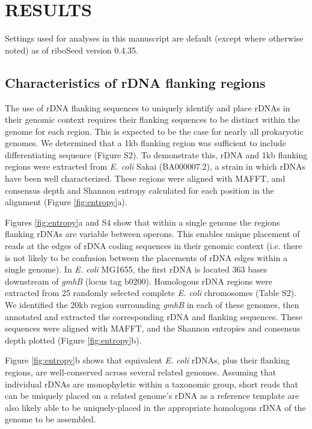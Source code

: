 \documentclass[a4,center,fleqn]{NAR}
\begin{document}
\section{RESULTS}

Settings used for analyses in this manuscript are default (except where otherwise noted) as of riboSeed version 0.4.35\cite{nicholas_r_waters_2017_1037965}.

\subsection*{Characteristics of rDNA flanking regions}
The use of rDNA flanking sequences to uniquely identify and place rDNAs in their genomic context requires their flanking sequences to be distinct within the genome for each region. This is expected to be the case for nearly all prokaryotic genomes. We determined that a 1kb flanking region was sufficient to include differentiating sequence (Figure S2). To demonstrate this, rDNA and 1kb flanking regions were extracted from \textit{E. coli} Sakai \cite{Hayashi2001} (BA000007.2), a strain in which  rDNAs have been well characterized\cite{Ohnishi2000}. These regions were aligned with MAFFT\cite{Katoh2002}, and consensus depth and Shannon entropy calculated for each position in the alignment (Figure \ref{fig:entropy}a).

Figures \ref{fig:entropy}a and S4 show that within a single genome the regions flanking rDNAs are variable between operons. This enables unique placement of reads at the edges of rDNA coding sequences in their genomic context (i.e. there is not likely to be confusion between the placements of rDNA edges within a single genome).
In \textit{E. coli} MG1655, the first rDNA is located 363 bases downstream of \textit{gmhB} (locus tag b0200). Homologous rDNA regions were extracted from 25 randomly selected complete \textit{E. coli} chromosomes (Table S2).  We identified the 20kb region surrounding \textit{gmhB} in each of these genomes, then annotated and extracted the corresponding rDNA and flanking sequences. These sequences were aligned with MAFFT, and the Shannon entropies and consensus depth plotted (Figure \ref{fig:entropy}b).

Figure \ref{fig:entropy}b shows that equivalent \textit{E. coli} rDNAs, plus their flanking regions, are well-conserved across several related genomes. Assuming that individual rDNAs are monophyletic within a taxonomic group, short reads that can be uniquely placed on a related genome's rDNA as a reference template are also likely able to be uniquely-placed in the appropriate homologous rDNA of the genome to be assembled.
\end{document}
